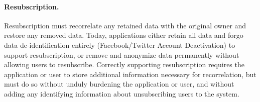 \paragraph{Resubscription.}
Resubscription must recorrelate any retained data with the original owner and restore any removed
data. Today, applications either retain all data and forgo data de-identification entirely
(Facebook/Twitter Account Deactivation) to support resubscription, or remove and anonymize data
permanently without allowing users to resubscribe. Correctly supporting resubscription requires the
application or user to store additional information necessary for recorrelation, but must do so
without unduly burdening the application or user, and without adding any identifying information
about unsubscribing users to the system.

%


%
%
%
%

